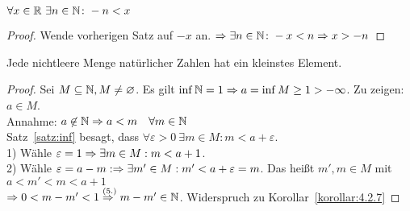 \begin{korollar}
    $\forall x\in\mathbb{R}~\exists n\in\mathbb{N}\colon -n<x$
    \begin{proof}
        Wende vorherigen Satz auf $-x$ an. $\Rightarrow{} \exists n\in\mathbb{N}\colon -x < n \Rightarrow{} x > -n$
    \end{proof}
\end{korollar}

\begin{satz}
    \label{satz:wohlordnungsprinzip}
    Jede nichtleere Menge natürlicher Zahlen hat ein kleinstes Element.
    \begin{proof}
        Sei $M\subseteq \mathbb{N}, M\neq\varnothing$. Es gilt $\inf \mathbb{N} = 1 \Rightarrow{} a = \inf M \geq 1 > -\infty$. Zu zeigen: $a\in M$.\\
        Annahme: $a\not\in\mathbb{N} \Rightarrow{} a < m\quad\forall m \in\mathbb{N}$\\
        Satz~\ref{satz:inf} besagt, dass $\forall \varepsilon > 0~\exists m\in M: m<a+\varepsilon$.\\
        1) Wähle $\varepsilon = 1 \Rightarrow{} \exists m\in M: m< a + 1$.\\
        2) Wähle $\varepsilon = a -m: \Rightarrow{} \exists m'\in M: m'<a+\varepsilon =m$. Das heißt $m',m\in M$ mit $a<m'<m<a+1$\\
        $\Rightarrow{} 0 < m-m' < 1 \overset{\text{(5.)}}{\Rightarrow{}} m-m'\in\mathbb{N}$. Widerspruch zu Korollar~\ref{korollar:4.2.7}
    \end{proof}
\end{satz}

\newpage
